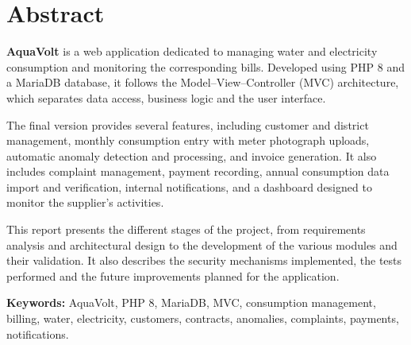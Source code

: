 
\chapter*{Abstract}

\textbf{AquaVolt} is a web application dedicated to managing water and electricity consumption and monitoring the corresponding bills. Developed using PHP 8 and a MariaDB database, it follows the Model--View--Controller (MVC) architecture, which separates data access, business logic and the user interface.

The final version provides several features, including customer and district management, monthly consumption entry with meter photograph uploads, automatic anomaly detection and processing, and invoice generation. It also includes complaint management, payment recording, annual consumption data import and verification, internal notifications, and a dashboard designed to monitor the supplier's activities.

This report presents the different stages of the project, from requirements analysis and architectural design to the development of the various modules and their validation. It also describes the security mechanisms implemented, the tests performed and the future improvements planned for the application.

\vspace{0.5cm}
\noindent\textbf{Keywords:} AquaVolt, PHP 8, MariaDB, MVC, consumption management, billing, water, electricity, customers, contracts, anomalies, complaints, payments, notifications.
